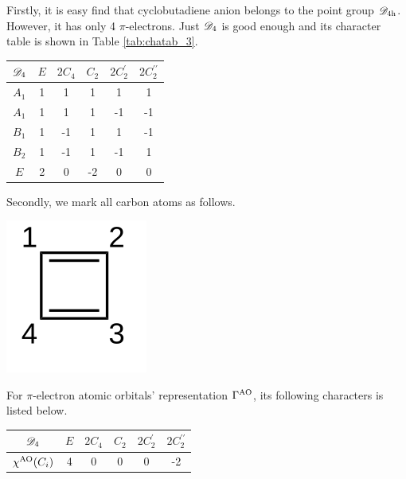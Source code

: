 \documentclass[a4paper]{book}
\newcommand{\AO}{{\rm AO}}
\newcommand\Tableref[1]{Table \ref{#1}}
\begin{document}
\begin{solution}
\begin{enumerate}[label=(\alph*)]
		Firstly, it is easy find that cyclobutadiene anion belongs to the point group $\mathscr{D}_{\rm 4h}$. However, it has only 4 $\pi$-electrons. Just $\mathscr{D}_{\rm 4}$ is good enough and its character table is shown in \Tableref{tab:chatab_3}.
		\begin{center}
		\setlength{\abovecaptionskip}{0em}
		\label{tab:chatab_3}
		\begin{tabular}{cccccc}\hline
	$\mathscr{D}_{\rm 4}$ & $E$ & $2C_4$ &	$C_2$	& $2C^\prime_2$ & $2C^{\prime\prime}_2$ \\ \hline
			$A_1$	&	1	&	1	&	1	&	1	&	1	\\
			$A_1$	&	1	&	1	&	1	&	-1	&	-1	\\
			$B_1$	&	1	&	-1	&	1	&	1	&	-1	\\
			$B_2$	&	1	&	-1	&	1	&	-1	&	1	\\
			$E$ 	&	2	&	0	&	-2	&	0	&	0\\ \hline
		\end{tabular}
		\end{center}
		
		Secondly, we mark all carbon atoms as follows.
		\begin{center}
		\setlength{\abovecaptionskip}{-0.5em}
		\includegraphics[scale=1.0]{./structures/exercise_1/cyclobutadiene_anion/0.png}
		\label{fig:case3}
		\end{center}
		
		For $\pi$-electron atomic orbitals' representation $\Gamma^{\rm AO}$, its following characters is listed below.
		\begin{center}
		\setlength{\abovecaptionskip}{-0.3em}
		\begin{tabular}{cccccc}\hline
	$\mathscr{D}_{\rm 4}$	& $E$ & $2C_4$ &	$C_2$	& $2C^\prime_2$ & $2C^{\prime\prime}_2$ \\ \hline
	$\chi^{\AO}(C_i)$	&	4	&	0	&	0	&	0	&	-2	\\ \hline
		\end{tabular}
		\end{center}
		

\end{enumerate}
\end{solution}
\end{document}
